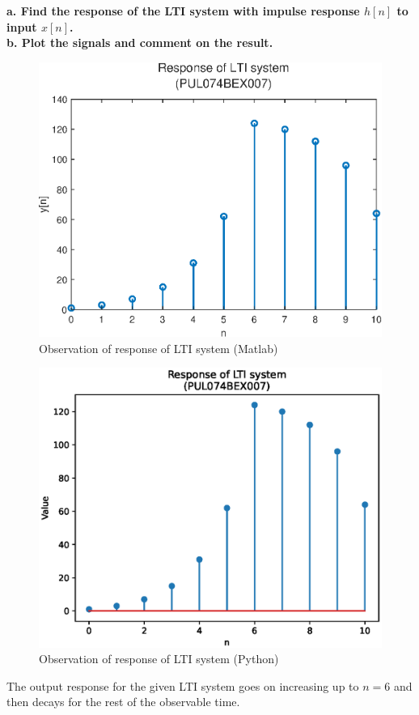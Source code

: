 \documentclass{lab_sheet}
\begin{document}
    \textbf{a. Find the response of the LTI system with impulse response $h[n]$ to input $x[n]$.}\\
    \textbf{b. Plot the signals and comment on the result.}
    \begin{figure}[H]
        \centering
        \includegraphics[width=0.73\linewidth]{../Figures/lab_3_3_ml.eps}
        \caption{Observation of response of LTI system (Matlab)}
        \label{fig:3_3_ml}
    \end{figure}
    \begin{figure}[H]
        \centering
        \includegraphics[width=0.8\linewidth]{../Figures/lab_3_3_py.eps}
        \caption{Observation of response of LTI system (Python)}
        \label{fig:3_3_py}
    \end{figure}
    The output response for the given LTI system goes on increasing up to $n=6$ and then decays for the rest of the observable time.
\end{document}
